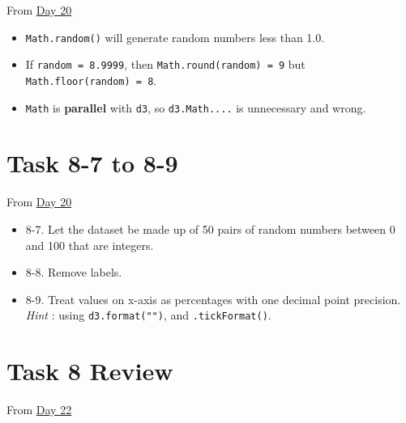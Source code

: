 \documentclass[
]{book}
\providecommand{\tightlist}{%
  \setlength{\itemsep}{0pt}\setlength{\parskip}{0pt}}
\begin{document}
From \href{https://observablehq.com/@hongtaoh/day-twenty-task-8-continued-2020-09-13}{Day 20}

\begin{itemize}
\tightlist
\item
  \texttt{Math.random()} will generate random numbers less than 1.0.
\item
  If \texttt{random\ =\ 8.9999}, then \texttt{Math.round(random)\ =\ 9} but \texttt{Math.floor(random)\ =\ 8}.
\item
  \texttt{Math} is \textbf{parallel} with \texttt{d3}, so \texttt{d3.Math....} is unnecessary and wrong.
\end{itemize}

\hypertarget{task-8-7-to-8-9}{%
\section{Task 8-7 to 8-9}\label{task-8-7-to-8-9}}

From \href{https://observablehq.com/@hongtaoh/day-twenty-task-8-continued-2020-09-13}{Day 20}

\begin{itemize}
\item
  8-7. Let the dataset be made up of 50 pairs of random numbers between 0 and 100 that are integers.
\item
  8-8. Remove labels.
\item
  8-9. Treat values on x-axis as percentages with one decimal point precision. \emph{Hint} : using \texttt{d3.format("")}, and \texttt{.tickFormat()}.
\end{itemize}

\hypertarget{task-8-review}{%
\section{Task 8 Review}\label{task-8-review}}

From \href{https://observablehq.com/@hongtaoh/day-twenty-two-spet-15th-2020}{Day 22}
\end{document}
